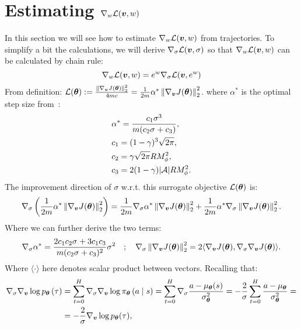 \chapter{Estimating $\gradDelta(\vv, w)$}\label{app:estimating}
\thispagestyle{empty}



In this section we will see how to estimate $\gradDelta(\vv, w)$ from trajectories. To simplify a bit the calculations, we will derive $\nabla_{\sigma}\Deltav(\vv, \sigma)$ so that $\gradDelta(\vv, w)$ can be calculated by chain rule: 
\begin{equation}
\gradDelta(\vv, w) = e^w \nabla_{\sigma}\Deltav(\vv, e^w)
\end{equation}
From definition: $\Deltav(\vtheta) := \frac{\norm[2]{\nabla_{\vv}J(\vtheta)}^2}{4mc} = \frac{1}{2m} \alpha^* \norm[2]{\nabla_{\vv}J(\vtheta)}^2$. 
where $\alpha^*$ is the optimal step size from~\cite{adaptive_step}:
\begin{align*}
&\alpha^* = \frac{c_1 \we[3]}{m(c_2 \we + c_3)},\\
&c_1 = (1-\gamma)^3\sqrt{2\pi},\\
&c_2 = \gamma\sqrt{2\pi}RM_{\phi}^2,\\
&c_3 = 2(1-\gamma)|\mathcal{A}|RM_{\phi}^2.
\end{align*}
The improvement direction of $\sigma$ w.r.t. this surrogate objective $\Deltav(\vtheta)$ is:
\begin{equation*}
\nabla_{\sigma}\left(\frac{1}{2m}\alpha^*\norm[2]{\gradJ[\vv]{\vtheta}}^2\right) 
=  \frac{1}{2m} \nabla_{\sigma}\alpha^*  \norm[2]{\gradJ[\vv]{\vtheta}}^2
+ \frac{1}{2m}\alpha^*\nabla_{\sigma}\norm[2]{\gradJ[\vv]{\vtheta}}^2.
\end{equation*}
Where we can further derive the two terms:
\begin{equation*}
\nabla_{\sigma}\alpha^* = \frac{2c_1c_2\we + 3c_1c_3}{m(c_2\we + c_3)^2}\we[2]
\quad;\quad
\nabla_{\sigma}\norm[2]{\gradJ[\vv]{\vtheta}}^2 =  2\langle\gradJ[\vv]{\vtheta}, \nabla_{\sigma}\gradJ[\vv]{\vtheta}\rangle.
\end{equation*}
Where $\langle\cdot\rangle$ here denotes scalar product between vectors. Recalling that:
\begin{align*}
\nabla_{\sigma}\nabla_{\vv}\log p_{\vtheta}\left(\tau\right)&=\sum_{t=0}^{H}\nabla_{\sigma}\nabla_{\vv}\log\pi_{\vtheta}\left(a\mid s\right)
 = \sum_{t=0}^{H}\nabla_{\sigma}\frac{a-\mu_{\vtheta}(s)}{\sigma_{\vtheta}^2}
 = -\frac{2}{\sigma} \sum_{t=0}^{H}\frac{a-\mu_{\vtheta}}{\sigma_{\vtheta}^2}  =\\ &= 
 -\frac{2 }{\sigma}\nabla_{\vv}\log p_{\vtheta}(\tau),
\end{align*}
